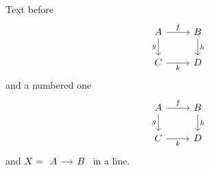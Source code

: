 \documentclass{article}
\begin{document}
Text before
\[
\begin{tikzcd}
A \arrow[r, "f"] \arrow[d, "g"'] & B \arrow[d, "h"] \\
C \arrow[r, "k"'] & D
\end{tikzcd}
\]
and a numbered one
\begin{equation}
\begin{tikzcd}
A \arrow[r, "f"] \arrow[d, "g"'] & B \arrow[d, "h"] \\
C \arrow[r, "k"'] & D
\end{tikzcd}
\end{equation}
and $X = \begin{tikzcd}[column sep=small] A \arrow[r] & B \end{tikzcd}$ in a line.
\end{document}
